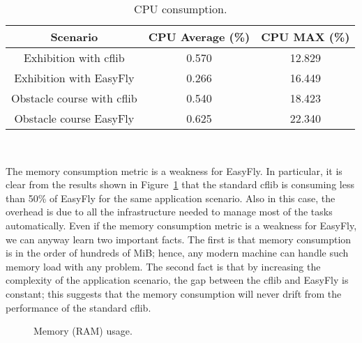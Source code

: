\begin{table}[tb]
    \centering
        \begin{tabular}{*{3}{|c}|}
        \hline
        \textbf{Scenario} & \textbf{CPU Average (\%)} & \textbf{CPU MAX (\%)} \\
        \hline \hline
        Exhibition with cflib & 0.570 & 12.829 \\
        \hline
        Exhibition with EasyFly & 0.266 & 16.449 \\
        \hline \hline
        Obstacle course with cflib & 0.540 & 18.423 \\
        \hline
        Obstacle course EasyFly & 0.625  & 22.340 \\
        \hline
        \end{tabular}
        \\[10pt]
        \caption{CPU consumption.}\label{table:cpu_consumption}
\end{table}

The memory consumption metric is a weakness for EasyFly. 
In particular, it is clear from the results shown in Figure~\ref{fig:ram_usage} that the standard cflib is consuming less than 50\% of EasyFly for the same application scenario.
Also in this case, the overhead is due to all the infrastructure needed to manage most of the tasks automatically.
Even if the memory consumption metric is a weakness for EasyFly, we can anyway learn two important facts.
The first is that memory consumption is in the order of hundreds of MiB; hence, any modern machine can handle such memory load with any problem.
The second fact is that by increasing the complexity of the application scenario, the gap between the cflib and EasyFly is constant; 
this suggests that the memory consumption will never drift from the performance of the standard cflib.

\begin{figure}[tb]
    \centering
    \quad
    \quad
    \quad
    \caption{Memory (RAM) usage.}\label{fig:ram_usage}
\end{figure}



